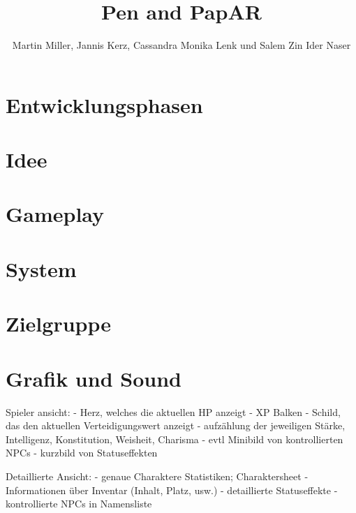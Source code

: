 \documentclass[11pt]{article}
\begin{document}
    \title{Pen and PapAR}
    \author{Martin Miller, Jannis Kerz, Cassandra Monika Lenk und Salem Zin Ider Naser}

    \maketitle
    \newpage

    \tableofcontents
    \newpage

    \section{Entwicklungsphasen}\label{sec:chapter_dev_process}
    

    \section{Idee}\label{sec:chapter_idea}
    

    \section{Gameplay}\label{sec:chapter_gameplay}
    

    \section{System}\label{sec:chapter_systems}
    

    \section{Zielgruppe}\label{sec:chapter_crowd}
    

    \section{Grafik und Sound}\label{sec:graphics/visuals}
    
    Spieler ansicht:
    - Herz, welches die aktuellen HP anzeigt
    - XP Balken
    - Schild, das den aktuellen Verteidigungswert anzeigt
    - aufzählung der jeweiligen Stärke, Intelligenz, Konstitution, Weisheit, Charisma
    - evtl Minibild von kontrollierten NPCs
    - kurzbild von Statuseffekten

    Detaillierte Ansicht:
    - genaue Charaktere Statistiken; Charaktersheet
    - Informationen über Inventar (Inhalt, Platz, usw.)
    - detaillierte Statuseffekte
    - kontrollierte NPCs in Namensliste
\end{document}
